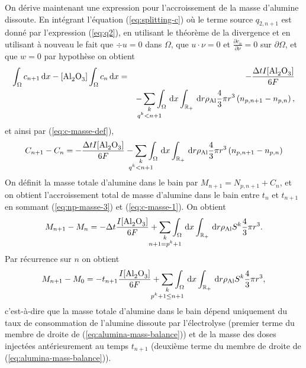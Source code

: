 On dérive maintenant une expression pour l'accroissement de la masse
d'alumine dissoute. En intégrant l'équation (\ref{eq:splitting-c}) où
le terme source $q_{2,n+1}$ est donné par l'expression (\ref{eq:q2}),
en utilisant le théorème de la divergence et en utilisant à nouveau le
fait que $\div u = 0$ dans $\Omega$, que $u\cdot \nu = 0$ et
$\frac{\partial c_n}{\partial \nu} = 0$ sur $\partial \Omega$, et que
$w = 0$ par hypothèse on obtient
\begin{eqnarray*}
[\cee{Al2O3}]\int_\Omega c_{n+1}\intd{x} - [\cee{Al2O3}] \int_\Omega
c_n\intd{x} &=& -\frac{\dt I [\cee{Al2O3}]}{6\faraday}\\
&& - \sum_{\mathclap{\substack{k \\ q^k < n+1}}}
\int_\Omega\intd{x}\int_\rplus\intd{r}\aluminadensity \frac{4}{3}\pi
r^3 \parent{n_{p,n+1} - n_{p,n}},\nonumber\\
\end{eqnarray*}
et ainsi par (\ref{eq:c-masse-def}),
\begin{eqnarray}
  C_{n+1} - C_n = -\frac{\dt I [\cee{Al2O3}]}{6\faraday} -
\sum_{\mathclap{\substack{k \\ q^k < n+1}}}
\int_\Omega\intd{x}\int_\rplus\intd{r}\aluminadensity \frac{4}{3}\pi
r^3 \parent{n_{p,n+1} - n_{p,n}}\label{eq:c-masse-1}
\end{eqnarray}
On définit la masse totale d'alumine dans le bain par $M_{n+1} =
N_{p,n+1} + C_n$, et on obtient l'accroissement total de masse
d'alumine dans le bain entre $t_n$ et $t_{n+1}$ en sommant
(\ref{eq:np-masse-3}) et (\ref{eq:c-masse-1}). On obtient
\begin{equation}
  M_{n+1} - M_{n} = - \dt \frac{I[\cee{Al2O3}]}{6\faraday} +
  \sum_{\mathclap{\substack{k\\ n+1 = p^k + 1}}} \int_\Omega\intd{x}\int_\rplus\intd{r}
  \aluminadensity S^k\frac{4}{3}\pi r^3.
\end{equation}
Par récurrence sur $n$ on obtient
\begin{equation}\label{eq:alumina-mass-balance}
  M_{n+1} - M_{0} = - t_{n+1} \frac{I[\cee{Al2O3}]}{6\faraday} +
  \sum_{\mathclap{\substack{k\\  p^k + 1 \leq n+1}}} \int_\Omega\intd{x}\int_\rplus\intd{r}
  \aluminadensity S^k\frac{4}{3}\pi r^3,
\end{equation}
c'est-à-dire que la masse totale d'alumine dans le bain dépend
uniquement du taux de consommation de l'alumine dissoute par
l'électrolyse (premier terme du membre de droite de
(\ref{eq:alumina-mass-balance})) et de la masse des doses
injectées antérieurement au temps $t_{n+1}$ (deuxième terme du membre
de droite de (\ref{eq:alumina-mass-balance})).

